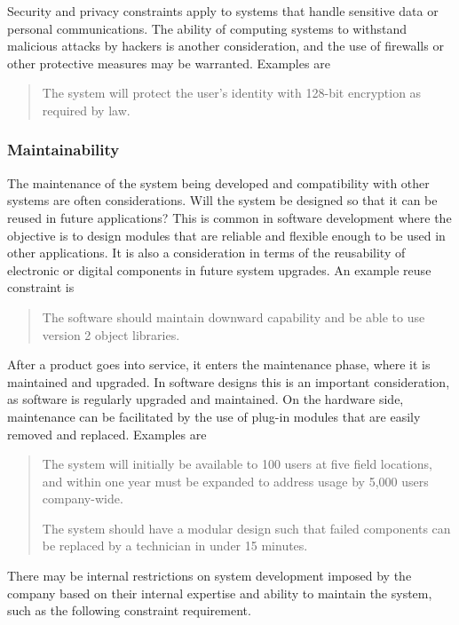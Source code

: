 Security and privacy constraints apply to systems that handle sensitive
data or personal communications. The ability of computing systems to
withstand malicious attacks by hackers is another consideration, and the
use of firewalls or other protective measures may be warranted. Examples
are

\begin{quote}
The system will protect the user's identity with 128-bit encryption as
required by law.
\end{quote}

\subsubsection*{Maintainability}\label{maintainability}

The maintenance of the system being developed and compatibility with
other systems are often considerations. Will the system be designed so
that it can be reused in future applications? This is common in software
development where the objective is to design modules that are reliable
and flexible enough to be used in other applications. It is also a
consideration in terms of the reusability of electronic or digital
components in future system upgrades. An example reuse constraint is

\begin{quote}
The software should maintain downward capability and be able to use
version 2 object libraries.
\end{quote}

After a product goes into service, it enters the maintenance phase,
where it is maintained and upgraded. In software designs this is an
important consideration, as software is regularly upgraded and
maintained. On the hardware side, maintenance can be facilitated by the
use of plug-in modules that are easily removed and replaced. Examples
are

\begin{quote}
The system will initially be available to 100 users at five field
locations, and within one year must be expanded to address usage by
5,000 users company-wide.

The system should have a modular design such that failed components can
be replaced by a technician in under 15 minutes.
\end{quote}

There may be internal restrictions on system development imposed by the
company based on their internal expertise and ability to maintain the
system, such as the following constraint requirement.

